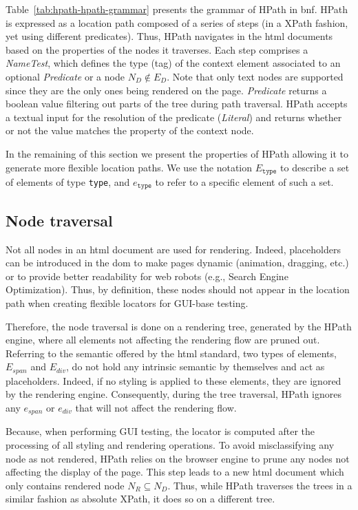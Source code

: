 Table~\ref{tab:hpath-hpath-grammar} presents the grammar of HPath in \gls{bnf}. HPath is expressed as a location path composed of a series of steps (in a XPath fashion, yet using different predicates). Thus, HPath navigates in the \gls{html} documents based on the properties of the nodes it traverses. Each step comprises a \emph{NameTest}, which defines the type (tag) of the context element associated to an optional \emph{Predicate} or a node $N_D \not\in E_D$. Note that only text nodes are supported since they are the only ones being rendered on the page. \emph{Predicate} returns a boolean value filtering out parts of the tree during path traversal. HPath accepts a textual input for the resolution of the predicate (\emph{Literal}) and returns whether or not the value matches the property of the context node.

In the remaining of this section we present the properties of HPath allowing it to generate more flexible location paths. We use the notation $E_{\texttt{type}}$ to describe a set of elements of type \texttt{type}, and $e_\texttt{type}$ to refer to a specific element of such a set.

\subsection{Node traversal}
\label{sec:hpath-hpath-node-traversal}

Not all nodes in an \gls{html} document are used for rendering. Indeed, placeholders can be introduced in the \gls{dom} to make pages dynamic (animation, dragging, etc.) or to provide better readability for web robots (e.g., Search Engine Optimization). Thus, by definition, these nodes should not appear in the location path when creating flexible locators for GUI-base testing. 

Therefore, the node traversal is done on a rendering tree, generated by the HPath engine, where all elements not affecting the rendering flow are pruned out. Referring to the semantic offered by the \gls{html} standard, two types of elements, $E_{span}$ and $E_{div}$, do not hold any intrinsic semantic by themselves and act as placeholders. Indeed, if no styling is applied to these elements, they are ignored by the rendering engine\cite{Grigorik2019}. Consequently, during the tree traversal, HPath ignores any $e_{span}$ or $e_{div}$ that will not affect the rendering flow.  

Because, when performing GUI testing, the locator is computed after the processing of all styling and rendering operations. To avoid misclassifying any node as not rendered, HPath relies on the browser engine to prune any nodes not affecting the display of the page. This step leads to a new \gls{html} document which only contains rendered node $N_R \subseteq N_D$. Thus, while HPath traverses the trees in a similar fashion as absolute XPath, it does so on a different tree.

